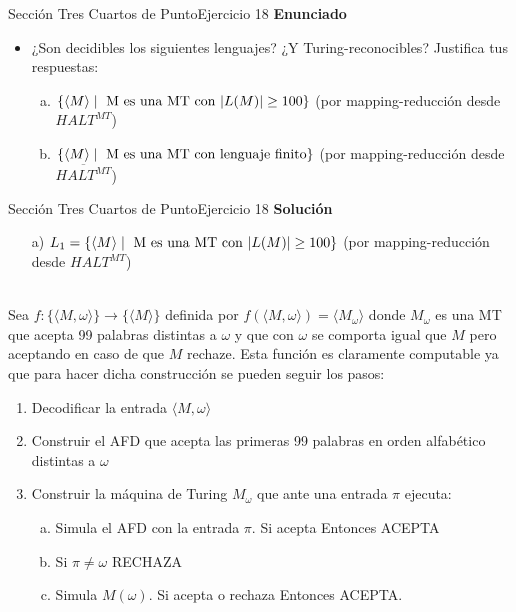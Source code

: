 \documentclass[10pt, envcountsect, presentation, aspectratio=169]{beamer}
\begin{document}

\begin{frame}{Sección Tres Cuartos de Punto}{Ejercicio 18}
    \textbf{Enunciado}
    \begin{itemize}
        \item ¿Son decidibles los siguientes lenguajes? ¿Y Turing-reconocibles? Justifica tus respuestas:
        \begin{enumerate}[a)]
            \item $\{\langle M \rangle \mid \hbox{ M es una MT con } |L(M)| \geq 100\}$ (por mapping-reducción desde $HALT^{MT}$)
            \item $\{\langle M \rangle \mid \hbox{ M es una MT con lenguaje finito}  \}$ (por mapping-reducción desde $\overline{HALT^{MT}}$)
        \end{enumerate}
    \end{itemize}
\end{frame}


\begin{frame}{Sección Tres Cuartos de Punto}{Ejercicio 18}
    \textbf{Solución}\\
    \begin{itemize}
        \item[a)] $L_1 = \{\langle M \rangle \mid \hbox{ M es una MT con } |L(M)| \geq 100\}$ (por mapping-reducción desde $HALT^{MT}$)\\~\\
    \end{itemize}
    Sea $f: \{\langle M, \omega \rangle\} \rightarrow \{\langle M \rangle \}$ definida por $f(\langle M, \omega \rangle) = \langle M_{\omega} \rangle$ donde $M_{\omega}$ es una MT que acepta 99 palabras distintas a $\omega$ y que con $\omega$ se comporta igual que $M$ pero aceptando en caso de que $M$ rechaze.
    Esta función es claramente computable ya que para hacer dicha construcción se pueden seguir los pasos:
    \begin{enumerate}
        \item Decodificar la entrada $\langle M, \omega \rangle$
        \item Construir el AFD que acepta las primeras 99 palabras en orden alfabético distintas a $\omega$
        \item Construir la máquina de Turing $M_{\omega}$ que ante una entrada $\pi$ ejecuta:
        \begin{enumerate}[a)]
            \item Simula el AFD con la entrada $\pi$. Si acepta Entonces ACEPTA
            \item Si $\pi \neq \omega$ RECHAZA
            \item Simula $M(\omega)$. Si acepta o rechaza Entonces ACEPTA.
        \end{enumerate}
    \end{enumerate}  
\end{frame}
\end{document}
